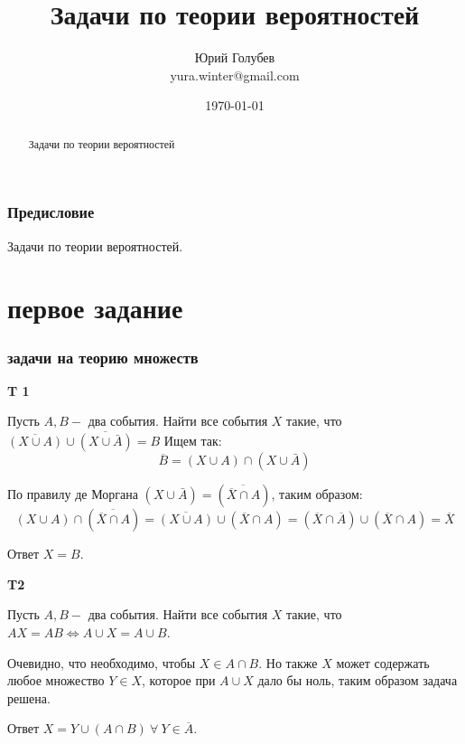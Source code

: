 \documentclass[a4paper,12pt]{article} %
\author{Юрий Голубев\\ yura.winter@gmail.com }
\title{Задачи по теории вероятностей}
\date{\today}
\begin{document}
\maketitle

\begin{abstract}
Задачи по теории вероятностей
\end{abstract}
\tableofcontents

\section*{Предисловие}

Задачи по теории вероятностей.





\clearpage
\part{первое задание}


\section{задачи на теорию множеств}

\begin{example}\textbf{T 1}


Пусть $A, B-$ два события. Найти все события $X$ такие, что 
$\overline{(X \cup A)} \cup \overline{(X \cup \bar{A})}=B$
Ищем так:
$$\overline{B}=
(X \cup A) \cap (X \cup \bar{A})
$$

По правилу де Моргана $(X \cup \bar{A})= (\overline{\overline{X} \cap A})$, таким образом:
$$
(X \cup A) \cap (\overline{\overline{X} \cap A}) =\overline{(X \cup A)} \cup (\overline{X} \cap A) =(\overline{X} \cap \overline{A}) \cup (\overline{X} \cap A)= \overline{X}
$$


Ответ $ X=B$.

\end{example}


\begin{example}\textbf{T2}

Пусть $A, B-$ два события. Найти все события $X$ такие, что $A X=A B \Longleftrightarrow  A \cup X=A \cup B$.

Очевидно, что необходимо, чтобы $X\in A\cap B$. Но также $X$ может содержать любое множество $ Y\in X $, которое при $A \cup X$ дало бы ноль, таким образом задача решена.

Ответ $ X=Y \cup (A\cap B)  \ \forall \ Y\in \overline{A}$.


\end{example}
\end{document}

